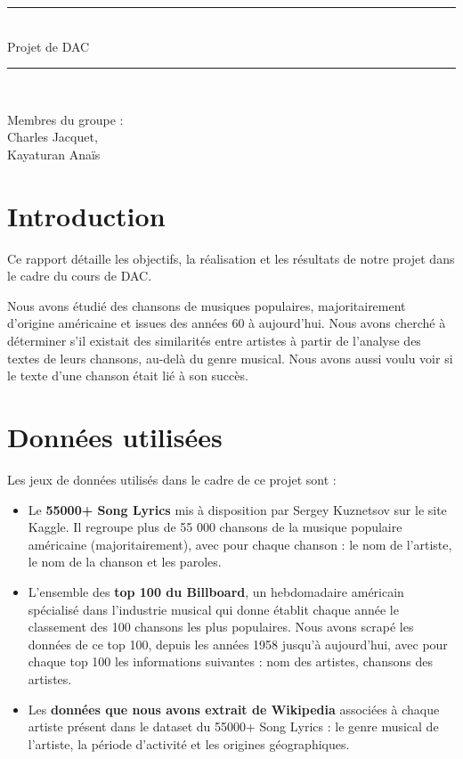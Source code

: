 \documentclass[a4paper, 12pt]{article}
\begin{document}
\begin{titlepage}
\newcommand{\HRule}{\rule{\linewidth}{0.5mm}}

\begin{center}

\HRule \\[0.4cm]
{ \huge Projet de DAC}\\[0.4cm] %
\HRule \\[2cm]

\vspace{2cm}

Membres du groupe : \\
Charles Jacquet, \\
Kayaturan Anaïs


\end{center}
\end{titlepage}

\tableofcontents
\newpage

\section*{Introduction}

Ce rapport détaille les objectifs, la réalisation et les résultats de notre projet dans le cadre du cours de DAC.

Nous avons étudié des chansons de musiques populaires, majoritairement d'origine américaine et issues des années 60 à aujourd'hui.
Nous avons cherché à déterminer s'il existait des similarités entre artistes à partir de l'analyse des textes de leurs chansons, au-delà du genre musical. Nous avons aussi voulu voir si le texte d'une chanson était lié à son succès.


\section{Données utilisées}

Les jeux de données utilisés dans le cadre de ce projet sont :
\begin{itemize}
	\item Le \textbf{55000+ Song Lyrics} mis à disposition par Sergey Kuznetsov sur le site Kaggle. Il regroupe plus de 55 000 chansons de la musique populaire américaine (majoritairement), avec pour chaque chanson : le nom de l'artiste, le nom de la chanson et les paroles.
	\item L'ensemble des \textbf{top 100 du Billboard}, un hebdomadaire américain spécialisé dans l'industrie musical qui donne établit chaque année le classement des 100 chansons les plus populaires. Nous avons scrapé les données de ce top 100, depuis les années 1958 jusqu'à aujourd'hui, avec pour chaque top 100 les informations suivantes : nom des artistes, chansons des artistes.
	\item Les \textbf{données que nous avons extrait de Wikipedia} associées à chaque artiste présent dans le dataset du 55000+ Song Lyrics : le genre musical de l'artiste, la période d'activité et les origines géographiques.
\end{itemize}
\end{document}
